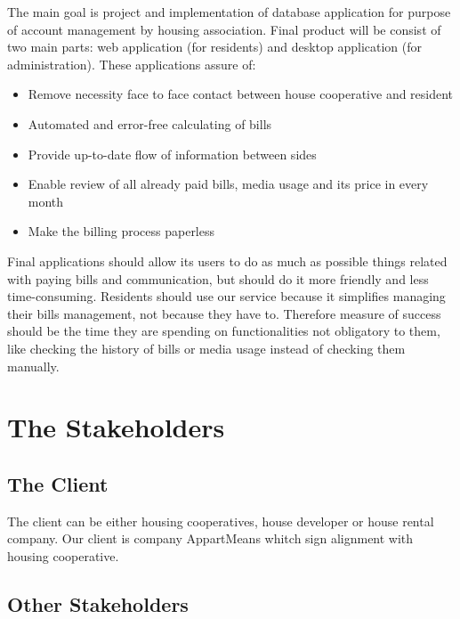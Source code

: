 \documentclass[a4paper,10pt]{report}
\begin{document}
The main goal is project and implementation of database application for purpose of account
management by housing association. Final product will be consist of two main parts: web
application (for residents) and desktop application (for administration). These applications
assure of:


\begin{itemize}
 
  \item Remove necessity face to face contact between house cooperative and resident
  \item  Automated and error-free calculating of bills
  \item Provide up-to-date flow of information between sides
  \item Enable review of all already paid bills, media usage and its price in every month
  \item Make the billing process paperless

\end{itemize}

Final applications should allow its users to do as much as possible things related with paying bills and communication, but should do it more friendly and less time-consuming. Residents should use our service because it simplifies managing their bills management, not because they have to. Therefore measure of success should be the time they are spending on functionalities not obligatory to them, like checking the history of bills or media usage instead of checking them manually.

\section{The Stakeholders}

\subsection{The Client}
The client can be either housing cooperatives,  house developer or house rental company. Our client is company AppartMeans whitch sign alignment with housing cooperative.

\subsection{Other Stakeholders}
\end{document}
